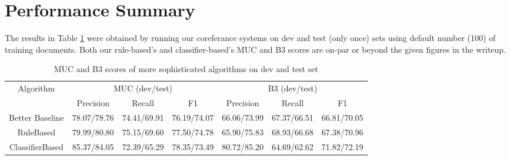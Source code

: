 \documentclass[letterpaper]{article}
\begin{document}
\section{Performance Summary}
The results in Table \ref{tab:other_algo} were obtained by running our coreferance systems on dev and test (only once) sets using default number (100) of training documents. Both our rule-based's and classifier-based's MUC and B3 scores are on-par or beyond the given figures in the writeup.
\begin{table}[h]
\begin{center}
\begin{tabular}{|c|c|c|c|c|c|c|}
\hline
\multirow{2}{*}{Algorithm} & 
\multicolumn{3}{c|}{MUC (dev/test)} & \multicolumn{3}{c|}{B3 (dev/test)} \\
\hhline{~------}
& Precision & Recall & F1 & Precision & Recall & F1 \\
\hline
Better Baseline & 78.07/78.76 & 74.41/69.91 & 76.19/74.07 
& 66.06/73.99 & 67.37/66.51 & 66.81/70.05 \\
\hline
RuleBased & 79.99/80.80 & 75.15/69.60 & 77.50/74.78 
& 65.90/75.83 & 68.93/66.68 & 67.38/70.96 \\
\hline
ClassifierBased & 85.37/84.05 & 72.39/65.29 & 78.35/73.49
& 80.72/85.20 & 64.69/62.62 & 71.82/72.19 \\
\hline
\end{tabular}
\caption{MUC and B3 scores of more sophisticated algorithms on dev and test set}\label{tab:other_algo}
\end{center}
\end{table}
 
\end{document}

